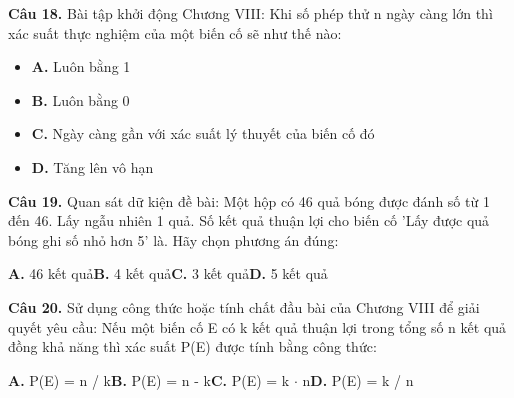\documentclass[11pt,a4paper]{article}
\begin{document}
\textbf{\color{primary} Câu 18.} Bài tập khởi động Chương VIII: Khi số phép thử n ngày càng lớn thì xác suất thực nghiệm của một biến cố sẽ như thế nào:\par
\begin{itemize}\setlength{\itemsep}{1pt}\setlength{\parskip}{0pt}
  \item[] \textbf{A.} Luôn bằng 1
  \item[] \textbf{B.} Luôn bằng 0
  \item[] \textbf{C.} Ngày càng gần với xác suất lý thuyết của biến cố đó
  \item[] \textbf{D.} Tăng lên vô hạn
\end{itemize}\vspace{2pt}
\textbf{\color{primary} Câu 19.} Quan sát dữ kiện đề bài: Một hộp có 46 quả bóng được đánh số từ 1 đến 46. Lấy ngẫu nhiên 1 quả. Số kết quả thuận lợi cho biến cố 'Lấy được quả bóng ghi số nhỏ hơn 5' là. Hãy chọn phương án đúng:\par
\hspace*{1.5em}\textbf{A.} 46 kết quả\quad\quad \textbf{B.} 4 kết quả\quad\quad \textbf{C.} 3 kết quả\quad\quad \textbf{D.} 5 kết quả\par\vspace{2pt}
\textbf{\color{primary} Câu 20.} Sử dụng công thức hoặc tính chất đầu bài của Chương VIII để giải quyết yêu cầu: Nếu một biến cố E có k kết quả thuận lợi trong tổng số n kết quả đồng khả năng thì xác suất P(E) được tính bằng công thức:\par
\hspace*{1.5em}\textbf{A.} P(E) = n / k\quad\quad \textbf{B.} P(E) = n - k\quad\quad \textbf{C.} P(E) = k $\cdot$ n\quad\quad \textbf{D.} P(E) = k / n\par\vspace{2pt}
\end{document}
